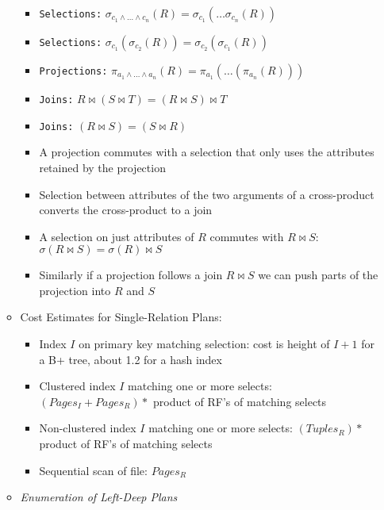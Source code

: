 \documentclass[landscape,8pt]{extarticle}
\newcommand{\code}{\lstinline}
\begin{document}
\begin{multicols}{5}
\begin{itemize}
\begin{itemize}
\begin{itemize}
                            \item \code{Selections:} $\sigma_{c_1 \land \dots \land c_n} (R) = \sigma_{c_1} ( \ldots \sigma_{c_n} (R))$
                            \item \code{Selections:} $\sigma_{c_1}(\sigma_{c_2}(R)) = \sigma_{c_2}(\sigma_{c_1}(R))$
                            \item \code{Projections:} $\pi_{a_1 \land \dots \land a_n}(R) = \pi_{a_1}(\dots (\pi_{a_n}(R)))$
                            \item \code{Joins:} $R \bowtie (S \bowtie T) = (R \bowtie S) \bowtie T$
                            \item \code{Joins:} $(R \bowtie S) = (S \bowtie R)$
                            \item A projection commutes with a selection that only uses the attributes retained by the projection
                            \item Selection between attributes of the two arguments of a cross-product converts the cross-product to a join
                            \item A selection on just attributes of $R$ commutes with $R \bowtie S$: $\sigma(R \bowtie S) = \sigma(R) \bowtie S$
                            \item Similarly if a projection follows a join $R \bowtie S$ we can push parts of the projection into $R$ and $S$
                        \end{itemize}
                  \item Cost Estimates for Single-Relation Plans:
                        \begin{itemize}
                            \item Index $I$ on primary key matching selection: cost is height of $I+1$ for a B+ tree, about 1.2 for a hash index
                            \item Clustered index $I$ matching one or more selects: $(Pages_I + Pages_R) *$ product of RF's of matching selects
                            \item Non-clustered index $I$ matching one or more selects: $(Tuples_R) *$ product of RF's of matching selects
                            \item Sequential scan of file: $Pages_R$
                        \end{itemize}
                  \item \emph{Enumeration of Left-Deep Plans}
                        \begin{itemize}

\end{itemize}
\end{itemize}
\end{itemize}
\end{multicols}
\end{document}

